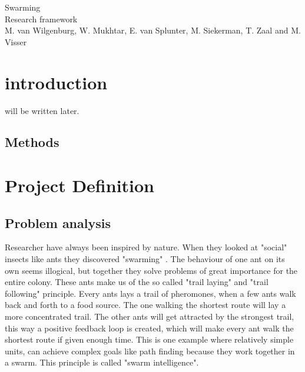 \documentclass[10pt,a4paper]{article}
\begin{document}
\begin{titlepage}
    \centering
    \vfill
    {\Large
    Swarming\\
   
    {\small Research framework}\\
        
        \vskip2cm
        {\small M. van Wilgenburg, W. Mukhtar, E. van Splunter, M. Siekerman, T. Zaal and M. Visser}\\
    }    
    \vfill
    
    \vfill
    \vfill
\end{titlepage}

\newpage

\listoffigures
\newpage

\listoftables
\newpage
\tableofcontents
\newpage

\section{introduction}
will be written later.

\subsection{Methods}


\section{Project Definition}

\subsection{Problem analysis}
Researcher have always been inspired by nature. When they looked at "social" insects like ants they discovered "swarming"\cite{swarmwiki} . The behaviour of one ant on its own seems illogical, but together they solve problems of great importance for the entire colony. These ants make us of the so called "trail laying" and "trail following" principle. Every ants lays a trail of pheromones, when a few ants walk back and forth to a food source. The one walking the shortest route will lay a more concentrated trail. The other ants will get attracted by the strongest trail, this way a positive feedback loop is created, which will make every ant walk the shortest route if given enough time. This is one example where relatively simple units, can achieve complex goals like path finding because they work together in a swarm. This principle is called "swarm intelligence"\cite{swarmintelligence}.
\end{document}
